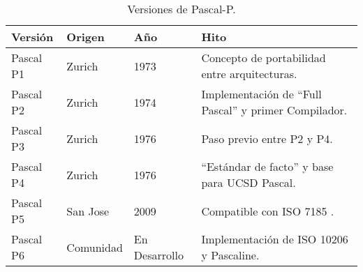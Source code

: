 %

\begin{table}[h]

\begin{center}

\begin{tabular}{|l|l|l|l|}\hline
\textbf{Versión} & \textbf{Origen} & \textbf{Año} & \textbf{Hito} \\ 
\hline
\hline
Pascal P1 & Zurich & 1973 & Concepto de portabilidad entre arquitecturas. \\ \hline
Pascal P2 & Zurich & 1974 & Implementación de ``Full Pascal'' y primer Compilador. \\ \hline
Pascal P3 & Zurich & 1976 & Paso previo entre P2 y P4. \\ \hline
Pascal P4 & Zurich & 1976 & ``Estándar de facto'' y base para  UCSD Pascal. \\ \hline
Pascal P5 & San Jose & 2009 & Compatible con ISO 7185 . \\ \hline
Pascal P6 & Comunidad & En Desarrollo & Implementación de ISO 10206 y Pascaline. \\ \hline
\end{tabular}

\caption{Versiones de Pascal-P.}

\end{center}

\end{table}
